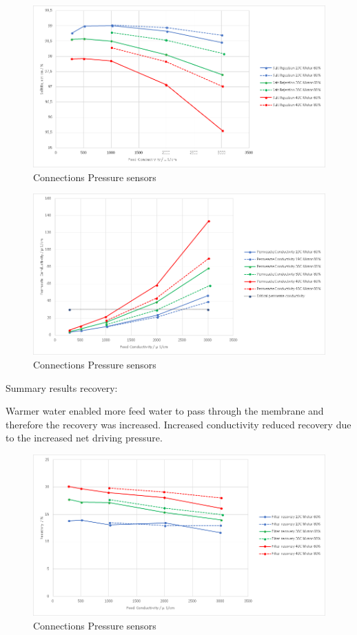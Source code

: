 \begin{figure}[H]
    \centering
    \includegraphics[width=1.1\textwidth]{SaltRejection}
    \caption{Connections Pressure sensors}
    \label{fig:PressConn}
\end{figure}

\begin{figure}[H]
    \centering
    \includegraphics[width=1.1\textwidth]{PermCond}
    \caption{Connections Pressure sensors}
    \label{fig:PressConn}
\end{figure}

Summary results recovery:

Warmer water enabled more feed water to pass through the membrane and therefore the recovery was increased. Increased conductivity reduced recovery due to the increased net driving pressure. 

\begin{figure}[H]
    \centering
    \includegraphics[width=1.1\textwidth]{Recovery}
    \caption{Connections Pressure sensors}
    \label{fig:PressConn}
\end{figure}


